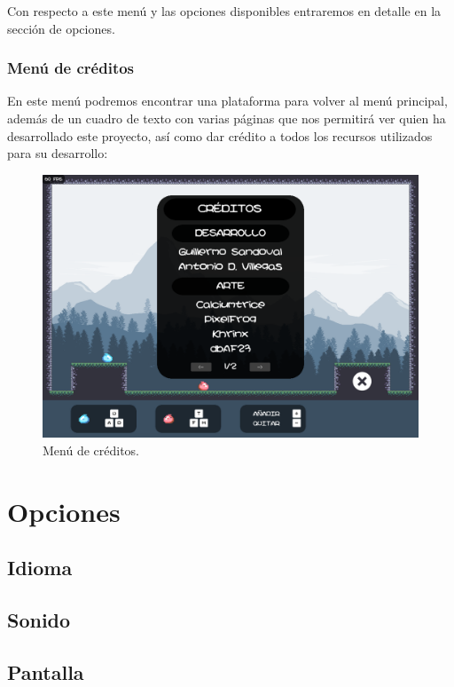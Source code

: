 \documentclass[12pt, spanish]{article}
\begin{document}
Con respecto a este menú y las opciones disponibles entraremos en detalle en la sección de opciones.

\subsubsection{Menú de créditos}

En este menú podremos encontrar una plataforma para volver al menú principal, además de un cuadro de texto con varias páginas que nos permitirá ver quien ha desarrollado este proyecto, así como dar crédito a todos los recursos utilizados para su desarrollo:

\begin{figure}[H]
	\centering
	\includegraphics[width=\textwidth]{"interfaz/creditos.png"}
	\caption{Menú de créditos.}\label{figure:creditos}
\end{figure}

\section{Opciones}

\subsection{Idioma}

\subsection{Sonido}

\subsection{Pantalla}
\end{document}

